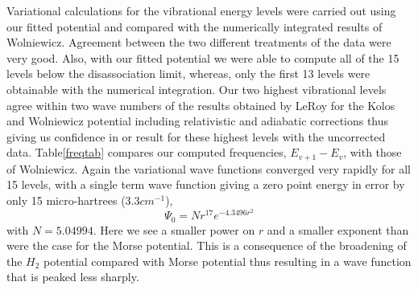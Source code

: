 \documentclass[12pt,thmsa]{article}
\begin{document}
Variational calculations for the vibrational energy levels were carried out
using our fitted potential and compared with the numerically integrated
results of Wolniewicz\cite{Wolniewicz66}. Agreement between the two
different treatments of the data were very good. Also, with our fitted
potential we were able to compute all of the 15 levels below the
disassociation limit, whereas, only the first 13 levels were obtainable with
the numerical integration. Our two highest vibrational levels agree within
two wave numbers of the results obtained by LeRoy\cite{LeRoy68} for the
Kolos and Wolniewicz potential including relativistic and adiabatic
corrections thus giving us confidence in or result for these highest levels
with the uncorrected data. Table\ref{freqtab} compares our computed
frequencies, $E_{v+1}-E_v$, with those of Wolniewicz\cite{Wolniewicz66}.
Again the variational wave functions converged very rapidly for all 15
levels, with a single term wave function giving a zero point energy in error
by only 15 micro-hartrees (3.3$cm^{-1}$), 
\begin{equation}
\Psi _0=Nr^{17}e^{-4.3496r^2}
\end{equation}
with $N=5.04994$. Here we see a smaller power on $r$ and a smaller exponent
than were the case for the Morse potential. This is a consequence of the
broadening of the $H_2$ potential compared with Morse potential thus
resulting in a wave function that is peaked less sharply.
\end{document}
